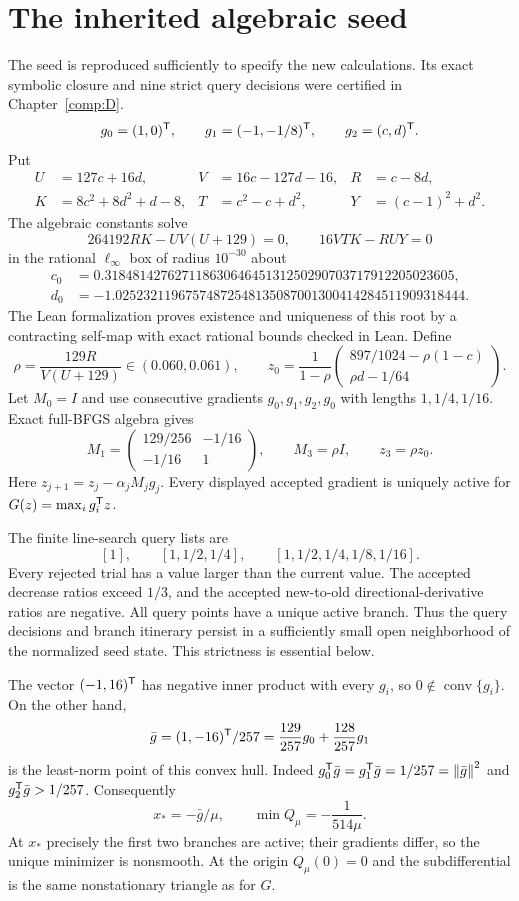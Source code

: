 \section{The inherited algebraic seed}
The seed is reproduced sufficiently to specify the new calculations. Its exact symbolic closure and nine strict query decisions were certified in Chapter~\ref{comp:D}.
\[
 g_0=(1,0)^{\mathsf T},\qquad g_1=(-1,-1/8)^{\mathsf T},\qquad g_2=(c,d)^{\mathsf T}.
\]
Put
\begin{align*}
 U&=127c+16d,&V&=16c-127d-16,&R&=c-8d,\\
 K&=8c^2+8d^2+d-8,&T&=c^2-c+d^2,&Y&=(c-1)^2+d^2.
\end{align*}
The algebraic constants solve
\[
 264192RK-UV(U+129)=0,\qquad 16VTK-RUY=0
\]
in the rational $\ell_\infty$ box of radius $10^{-30}$ about
\begin{align*}
 c_0&=0.31848142762711863064645131250290703717912205023605,\\
 d_0&=-1.02523211967574872548135087001300414284511909318444.
\end{align*}
The Lean formalization proves existence and uniqueness of this root by a contracting self-map with exact rational bounds checked in Lean. Define
\[
 \rho=\frac{129R}{V(U+129)}\in(0.060,0.061),\qquad
 z_0=\frac1{1-\rho}
 \begin{pmatrix}897/1024-\rho(1-c)\\ \rho d-1/64\end{pmatrix}.
\]
Let $M_0=I$ and use consecutive gradients $g_0,g_1,g_2,g_0$ with lengths $1,1/4,1/16$. Exact full-BFGS algebra gives
\[
 M_1=\begin{pmatrix}129/256&-1/16\\-1/16&1\end{pmatrix},
 \qquad M_3=\rho I,\qquad z_3=\rho z_0.
\]
Here $z_{j+1}=z_j-\alpha_jM_jg_j$. Every displayed accepted gradient is uniquely active for $G(z)=\max_i g_i^{\mathsf T} z$.

The finite line-search query lists are
\[
 [1],\qquad[1,1/2,1/4],\qquad[1,1/2,1/4,1/8,1/16].
\]
Every rejected trial has a value larger than the current value. The accepted decrease ratios exceed $1/3$, and the accepted new-to-old directional-derivative ratios are negative. All query points have a unique active branch. Thus the query decisions and branch itinerary persist in a sufficiently small open neighborhood of the normalized seed state. This strictness is essential below.

The vector $(-1,16)^{\mathsf T}$ has negative inner product with every $g_i$, so $0\notin\operatorname{conv}\{g_i\}$. On the other hand,
\[
 \bar g=(1,-16)^{\mathsf T}/257
 =\frac{129}{257}g_0+\frac{128}{257}g_1
\]
is the least-norm point of this convex hull. Indeed $g_0^{\mathsf T}\bar g=g_1^{\mathsf T}\bar g=1/257=\left\lVert\bar g\right\rVert^2$ and $g_2^{\mathsf T}\bar g>1/257$. Consequently
\begin{equation}\label{L:eq:minimizer}
 x_*=-\bar g/\mu,\qquad \min Q_\mu=-\frac1{514\mu}.
\end{equation}
At $x_*$ precisely the first two branches are active; their gradients differ, so the unique minimizer is nonsmooth. At the origin $Q_\mu(0)=0$ and the subdifferential is the same nonstationary triangle as for $G$.


